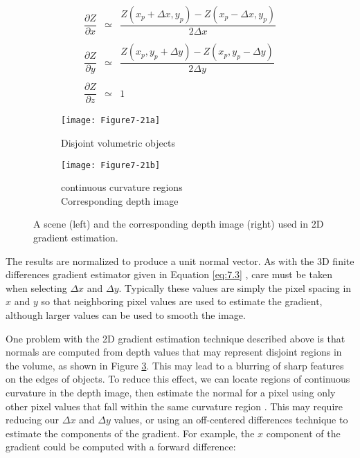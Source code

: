 \begin{equation}\label{eq:7.9}
\begin{array}{lll}
\dfrac{\partial Z}{\partial x} &\simeq& \dfrac{Z\left(x_p + \Delta x, y_p\right) - Z\left(x_p - \Delta x, y_p\right)}{2 \Delta x} \\ \\
\dfrac{\partial Z}{\partial y} &\simeq& \dfrac{Z\left(x_p, y_p + \Delta y\right) - Z\left(x_p, y_p - \Delta y\right)}{2 \Delta y} \\ \\
\dfrac{\partial Z}{\partial z} &\simeq& 1
\end{array}
\end{equation}

\begin{figure}[!htb]
	\begin{subfigure}[h]{0.48\linewidth}
		\texttt{[image: Figure7-21a]}
		\caption*{Disjoint volumetric objects}\label{fig:Figure7-21a}
	\end{subfigure}
	\hfill
	\begin{subfigure}[h]{0.48\linewidth}
		\texttt{[image: Figure7-21b]}
		\captionsetup{justification=centering}
		\caption*{continuous curvature regions\\Corresponding depth image}\label{fig:Figure7-21b}
	\end{subfigure}%
	\caption{A scene (left) and the corresponding depth image (right) used in 2D gradient estimation.}\label{fig:Figure7-21}
\end{figure}

The results are normalized to produce a unit normal vector. As with the 3D finite differences gradient estimator given in Equation \ref{eq:7.3} , care must be taken when selecting $\Delta x$ and $\Delta y$. Typically these values are simply the pixel spacing in $x$ and $y$ so that neighboring pixel values are used to estimate the gradient, although larger values can be used to smooth the image.

One problem with the 2D gradient estimation technique described above is that normals are computed from depth values that may represent disjoint regions in the volume, as shown in Figure \ref{fig:Figure7-21}. This may lead to a blurring of sharp features on the edges of objects. To reduce this effect, we can locate regions of continuous curvature in the depth image, then estimate the normal for a pixel using only other pixel values that fall within the same curvature region \cite{Yagel92a}. This may require reducing our $\Delta x$ and $\Delta y$ values, or using an off-centered differences technique to estimate the components of the gradient. For example, the $x$ component of the gradient could be computed with a forward difference:


